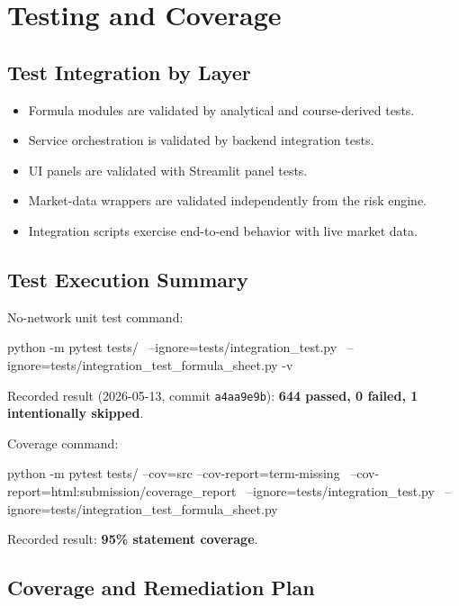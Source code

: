\documentclass[11pt]{article}
\newcommand{\code}[1]{\texttt{#1}}
\begin{document}
\section{Testing and Coverage}

\subsection{Test Integration by Layer}

\begin{itemize}
  \item Formula modules are validated by analytical and course-derived tests.
  \item Service orchestration is validated by backend integration tests.
  \item UI panels are validated with Streamlit panel tests.
  \item Market-data wrappers are validated independently from the risk engine.
  \item Integration scripts exercise end-to-end behavior with live market data.
\end{itemize}

\subsection{Test Execution Summary}

No-network unit test command:
\begin{shellcode}
python -m pytest tests/ \
  --ignore=tests/integration_test.py \
  --ignore=tests/integration_test_formula_sheet.py -v
\end{shellcode}

Recorded result (2026-05-13, commit \code{a4aa9e9b}):
\textbf{644 passed, 0 failed, 1 intentionally skipped}.

Coverage command:
\begin{shellcode}
python -m pytest tests/ --cov=src --cov-report=term-missing \
  --cov-report=html:submission/coverage_report \
  --ignore=tests/integration_test.py \
  --ignore=tests/integration_test_formula_sheet.py
\end{shellcode}

Recorded result: \textbf{95\% statement coverage}.

\subsection{Coverage and Remediation Plan}
\end{document}
